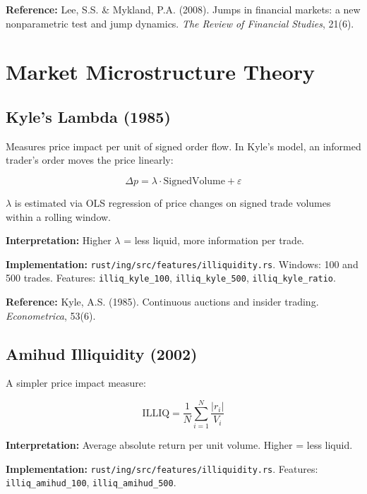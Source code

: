 \documentclass[11pt,a4paper]{article}
\begin{document}
\textbf{Reference:} Lee, S.S. \& Mykland, P.A. (2008). Jumps in financial markets: a new nonparametric test and jump dynamics. \textit{The Review of Financial Studies}, 21(6).

\newpage
\section{Market Microstructure Theory}

\subsection{Kyle's Lambda (1985)}

Measures price impact per unit of signed order flow. In Kyle's model, an informed trader's order moves the price linearly:

\begin{equation}
\Delta p = \lambda \cdot \text{SignedVolume} + \varepsilon
\end{equation}

$\lambda$ is estimated via OLS regression of price changes on signed trade volumes within a rolling window.

\textbf{Interpretation:} Higher $\lambda$ = less liquid, more information per trade.

\textbf{Implementation:} \texttt{rust/ing/src/features/illiquidity.rs}. Windows: 100 and 500 trades. Features: \texttt{illiq\_kyle\_100}, \texttt{illiq\_kyle\_500}, \texttt{illiq\_kyle\_ratio}.

\textbf{Reference:} Kyle, A.S. (1985). Continuous auctions and insider trading. \textit{Econometrica}, 53(6).

\subsection{Amihud Illiquidity (2002)}

A simpler price impact measure:

\begin{equation}
\text{ILLIQ} = \frac{1}{N} \sum_{i=1}^{N} \frac{|r_i|}{V_i}
\end{equation}

\textbf{Interpretation:} Average absolute return per unit volume. Higher = less liquid.

\textbf{Implementation:} \texttt{rust/ing/src/features/illiquidity.rs}. Features: \texttt{illiq\_amihud\_100}, \texttt{illiq\_amihud\_500}.
\end{document}
